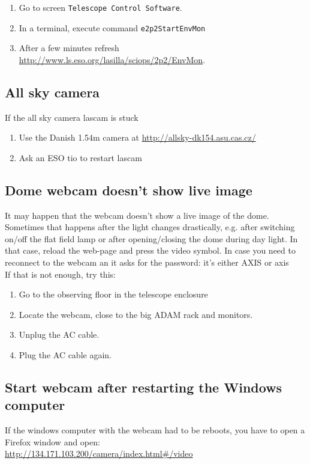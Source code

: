 \documentclass[11pt,fleqn,a4paper]{book}
\begin{document}
\begin{enumerate}
  \item Go to screen \texttt{Telescope Control Software}.
  \item In a terminal, execute command \texttt{e2p2StartEnvMon}
  \item After a few minutes refresh \url{http://www.ls.eso.org/lasilla/sciops/2p2/EnvMon}.
\end{enumerate}

\subsection{All sky camera}
If the all sky camera \gls{lascam} is stuck
\begin{enumerate}
  \item Use the Danish 1.54m camera at \url{http://allsky-dk154.asu.cas.cz/}
  \item Ask an ESO \gls{tio} to restart \gls{lascam}
\end{enumerate}

\subsection{Dome webcam doesn't show live image}
It may happen that the \gls{webcam} doesn't show a live image of the dome. Sometimes that happens after the light changes drastically, e.g. after  switching on/off the flat field lamp or after opening/closing the dome during day light. In that case, reload the web-page and press the video symbol. In case  you need to reconnect to the webcam an it asks for the password: it's either AXIS or axis\\

If that is not enough, try this:
\begin{enumerate}
   \item Go to the observing floor in the telescope enclosure
   \item Locate the webcam, close to the big ADAM rack and monitors.
   \item Unplug the AC cable.
   \item Plug the AC cable again.
\end{enumerate}

\subsection{Start webcam after restarting the Windows computer}
If the windows computer with the webcam had to be reboots, you have to open a Firefox window and open:\\
\url{http://134.171.103.200/camera/index.html#/video}
\end{document}
